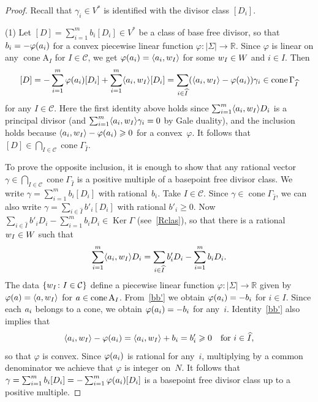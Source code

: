 \documentclass[a4paper]{amsart}
\theoremstyle{definition}
\theoremstyle{remark}
\numberwithin{equation}{section}
\def\R{\mathbb R}
\def\R{\mathbb R}
\newcommand{\mb}[1]{{\textbf {\textit#1}}}
\renewcommand{\ge}{\geqslant}
\def\Ker{\mathop{\mathrm{Ker}}}
\def\cone{\mathop{\mathrm{cone}}}
\newcommand{\<}{\langle}
\renewcommand{\>}{\rangle}
\begin{document}
\begin{proof}
Recall that $\gamma_i\in V^*$ is identified with the divisor class $[D_i]$.

(1) Let $[D]=\sum_{i=1}^m b_i[D_i]\in V^*$ be a class of base free divisor, so that $b_i=-\varphi(\mb a_i)$ for a convex piecewise linear function $\varphi\colon|\Sigma|\to\R$. Since $\varphi$ is linear on any $\cone\mathrm A_I$ for $I\in\mathcal C$, we get $\varphi(\mb a_i)=\langle\mb a_i,\mb w_I\rangle$ for some $\mb w_I\in W$ and $i\in I$. Then
\[
  [D]=-\sum_{i=1}^m\varphi(\mb a_i)[D_i]+
  \sum_{i=1}^m\langle\mb a_i,\mb w_I\rangle[D_i]=
  \sum_{i\in\widehat I}(\langle\mb a_i,\mb w_I\rangle-\varphi(\mb a_i))\gamma_i
  \in\cone\Gamma_{\widehat I}
\]
for any $I\in\mathcal C$. Here the first identity above holds since $\sum_{i=1}^m\langle\mb a_i,\mb w_I\rangle D_i$ is a principal divisor (and $\sum_{i=1}^m\langle\mb a_i,\mb w_I\rangle\gamma_i=0$ by Gale duality), and the inclusion holds because $\langle\mb a_i,\mb w_I\rangle-\varphi(\mb a_i)\ge0$ for a convex~$\varphi$.  It follows that $[D]\in\bigcap_{I\in\mathcal C}\cone\Gamma_{\widehat I}$.

To prove the opposite inclusion, it is enough to show that any rational vector 
$\gamma\in\bigcap_{I\in\mathcal C}\cone\Gamma_{\widehat I}$ is a positive multiple of a basepoint free divisor class. We write $\gamma=\sum_{i=1}^m b_i[D_i]$ with rational~$b_i$. Take $I\in\mathcal C$. Since $\gamma\in\cone\Gamma_{\widehat I}$, we can also write 
$\gamma=\sum_{i\in\widehat I}b'_i[D_i]$ with rational $b'_i\ge0$. Now 
$\sum_{i\in\widehat I}b'_iD_i-\sum_{i=1}^m b_iD_i\in\Ker\varGamma$ (see~\eqref{Rclas}), so that there is a rational $\mb w_I\in W$ such that
\begin{equation}\label{bb'}
  \sum_{i=1}^m\langle\mb a_i,\mb w_I\rangle D_i=\sum_{i\in\widehat I}b'_iD_i-\sum_{i=1}^m b_iD_i.
\end{equation}
The data $\{\mb w_I\colon I\in\mathcal C\}$ define a piecewise linear function $\varphi\colon|\Sigma|\to\R$ given by $\varphi(\mb a)=\langle\mb a,\mb w_I\rangle$ for $\mb a\in\cone\mathrm A_I$. From~\eqref{bb'} we obtain $\varphi(\mb a_i)=-b_i$ for $i\in I$. Since each $\mb a_i$ belongs to a cone, we obtain $\varphi(\mb a_i)=-b_i$ for any~$i$. Identity~\eqref{bb'} also implies that
\[
  \langle\mb a_i,\mb w_I\rangle-\varphi(\mb a_i)=
  \langle\mb a_i,\mb w_I\rangle+b_i=b'_i\ge0
  \quad\text{for }i\in\widehat I,
\]
so that $\varphi$ is convex. Since $\varphi(\mb a_i)$ is rational for any~$i$, multiplying by a common denominator we achieve that $\varphi$ is integer on~$N$. It follows that $\gamma=\sum_{i=1}^m b_i[D_i]=-\sum_{i=1}^m\varphi(\mb a_i)[D_i]$ is a basepoint free divisor class up to a positive multiple.


\end{proof}
\end{document}
